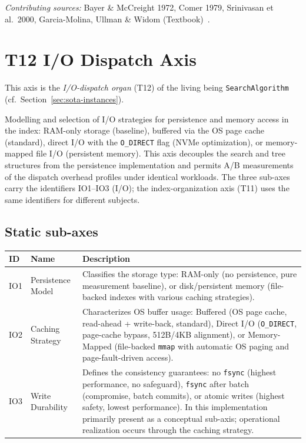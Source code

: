 \emph{Contributing sources:} Bayer \& Mc\allowbreak{}Creight 1972, Comer 1979, Srinivasan et al.\ 2000, Garcia-Molina, Ullman \& Widom (Textbook)~\cite{bayer1972btree,comer1979btree,srinivasan2000oracle8iiot,garciamolina2009dbsystems}.


\section{T12 I/\allowbreak{}O Dispatch Axis}

This axis is the \emph{I/O-dispatch organ} (T12) of the living being \texttt{SearchAlgorithm} (cf.\ Section~\ref{sec:sota-instances}).

Modelling and selection of I/\allowbreak{}O strategies for persistence and memory access in the index: RAM-only storage (baseline), buffered via the OS page cache (standard), direct I/\allowbreak{}O with the \texttt{O\_\allowbreak{}DIRECT} flag (NVMe optimization), or memory-mapped file I/\allowbreak{}O (persistent memory). This axis decouples the search and tree structures from the persistence implementation and permits A/\allowbreak{}B measurements of the dispatch overhead profiles under identical workloads. The three sub-axes carry the identifiers IO1--IO3 (I/\allowbreak{}O); the index-organization axis (T11) uses the same identifiers for different subjects.

\subsection*{Static sub-axes}

\begin{scriptsize}
\begin{longtable}{@{}>{\raggedright\arraybackslash}p{1.8cm} >{\raggedright\arraybackslash}p{3.2cm} >{\raggedright\arraybackslash}p{8.5cm}@{}}
\toprule
ID & Name & Description \\
\midrule
\endhead%
IO1 & Persistence Model & Classifies the storage type: RAM-only (no persistence, pure measurement baseline), or disk/\allowbreak{}persistent memory (file-backed indexes with various caching strategies). \\
IO2 & Caching Strategy & Characterizes OS buffer usage: Buffered (OS page cache, read-ahead + write-back, standard), Direct I/\allowbreak{}O (\texttt{O\_\allowbreak{}DIRECT}, page-cache bypass, 512\allowbreak{}B/\allowbreak{}4\allowbreak{}KB alignment), or Memory-Mapped (file-backed \texttt{mmap} with automatic OS paging and page-fault-driven access). \\
IO3 & Write Durability & Defines the consistency guarantees: no \texttt{fsync} (highest performance, no safeguard), \texttt{fsync} after batch (compromise, batch commits), or atomic writes (highest safety, lowest performance). In this implementation primarily present as a conceptual sub-axis; operational realization occurs through the caching strategy. \\
\bottomrule
\end{longtable}
\end{scriptsize}

